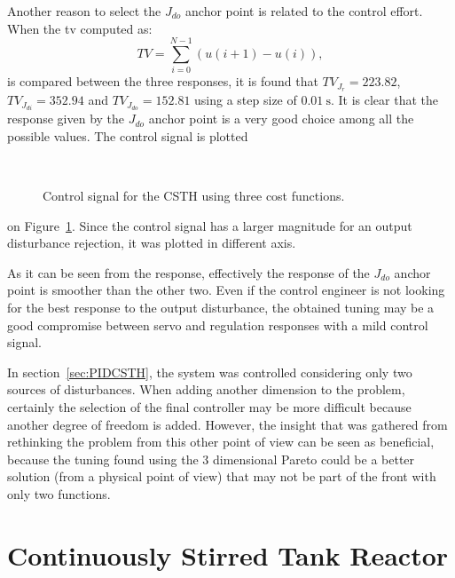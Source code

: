 Another reason to select the $J_{do}$ anchor point is related to the control effort. When the \gls{tv} computed as:
\begin{equation*}
TV = \sum_{i=0}^{N-1}\left(  u(i+1)-u(i)\right),
\end{equation*}
is compared between the three responses, it is found that $TV_{J_r} = 223.82$, $TV_{J_{di}} = 352.94$ and $TV_{J_{do}} = 152.81$ using a step size of $\SI{0.01}{\second}$. It is clear that the response given by the $J_{do}$ anchor point is a very good choice among all the possible values. The control signal is plotted %
%
\begin{figure}[tb]
	\centering
	\\
	\caption{Control signal for the CSTH using three cost functions.}
	\label{fig:Ch7CSTHControlledCV3Fun}
\end{figure}
%
on Figure~\ref{fig:Ch7CSTHControlledCV3Fun}. Since the control signal has a larger magnitude for an output disturbance rejection, it was plotted in different axis.

As it can be seen from the response, effectively the response of the $J_{do}$ anchor point is smoother than the other two. Even if the control engineer is not looking for the best response to the output disturbance, the obtained tuning may be a good compromise between servo and regulation responses with a mild control signal.

In section~\ref{sec:PIDCSTH}, the system was controlled considering only two sources of disturbances. When adding another dimension to the problem, certainly the selection of the final controller may be more difficult because another degree of freedom is added. However, the insight that was gathered from rethinking the problem from this other point of view can be seen as beneficial, because the tuning found using the 3 dimensional Pareto could be a better solution (from a physical point of view) that may not be part of the front with only two functions.
%
%
\section{Continuously Stirred Tank Reactor}
\label{sec:CSTRVandeVusse}
%
